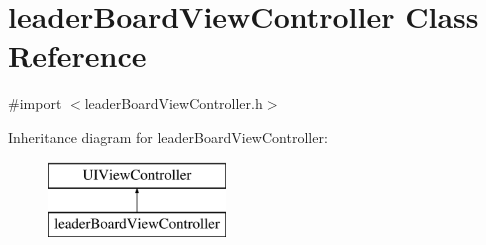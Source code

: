 \hypertarget{interfaceleader_board_view_controller}{}\section{leader\+Board\+View\+Controller Class Reference}
\label{interfaceleader_board_view_controller}


{\ttfamily \#import $<$leader\+Board\+View\+Controller.\+h$>$}

Inheritance diagram for leader\+Board\+View\+Controller\+:\begin{figure}[H]
\begin{center}
\leavevmode
\includegraphics[height=2.000000cm]{interfaceleader_board_view_controller}
\end{center}
\end{figure}
